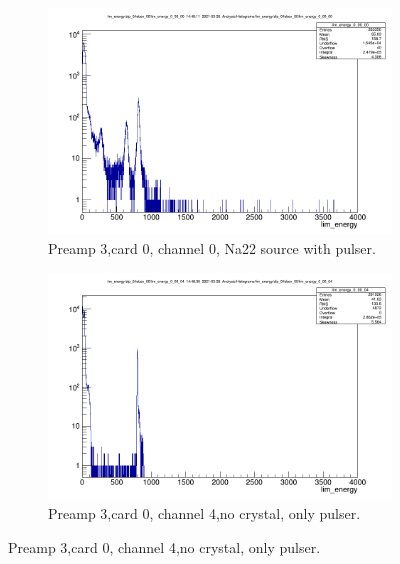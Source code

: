 \documentclass{report}
\begin{document}
\begin{figure}[!htb]
  \centering
  \begin{subfigure}[b]{0.45\textwidth}
    \includegraphics[width=\linewidth]{preamp3_lim_energy_card0_ch0.png}
    \caption{Preamp 3,card 0, channel 0, Na22 source with pulser.}
  \end{subfigure}
  \begin{subfigure}[b]{0.45\textwidth}
    \includegraphics[width=\linewidth]{preamp3_lim_energy_card0_ch4_no_crystal.png}
    \caption{Preamp 3,card 0, channel 4,no crystal, only pulser.}
  \end{subfigure}
\end{figure}
\end{document}
